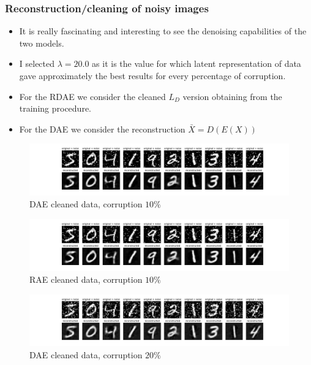 \documentclass{beamer}
\theoremstyle{plain}
\theoremstyle{definition}
\theoremstyle{remark}
\begin{document}
\begin{frame}
	\frametitle{Reconstruction/cleaning of noisy images}
	\begin{itemize}
		\item It is really fascinating and interesting to see the denoising capabilities of the two models.
		\item I selected $\lambda=20.0$ as it is the value for which latent representation of data gave approximately the best results for every percentage of corruption.
		\item For the RDAE we consider the cleaned $L_D$ version obtaining from the training procedure.
		\item For the DAE we consider the reconstruction $\bar{X}=D(E(X))$
	\end{itemize}
\end{frame}

\begin{frame}
	\begin{figure}
		\centering
		\includegraphics[width=0.95\linewidth]{Images/lam20.0corr0.1/DAE_recon.png}
		\caption[]{DAE cleaned data, corruption $10\%$}
	\end{figure}
\end{frame}

\begin{frame}
	\begin{figure}
		\centering
		\includegraphics[width=0.95\linewidth]{Images/lam20.0corr0.1/RAE_recon.png}
		\caption[]{RAE cleaned data, corruption $10\%$}
	\end{figure}
\end{frame}

\begin{frame}
	\begin{figure}
		\centering
		\includegraphics[width=0.95\linewidth]{Images/lam20.0corr0.2/DAE_recon.png}
		\caption[]{DAE cleaned data, corruption $20\%$}
	\end{figure}
\end{frame}
\end{document}
